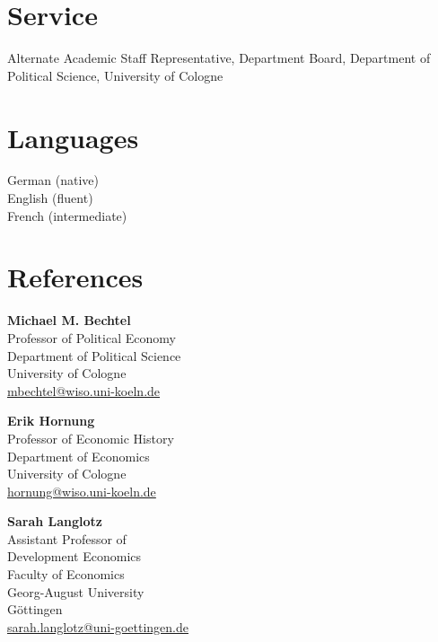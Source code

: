 \documentclass[a4paper,11pt]{article}
\begin{document}
\section{Service}

Alternate Academic Staff Representative, Department Board, Department of Political Science, University of Cologne

\section{Languages}

German (native)\\
English (fluent)\\
French (intermediate)

\section{References}

{\small
\begin{minipage}[t]{0.32\textwidth}
  \textbf{Michael M. Bechtel}\\
  Professor of Political Economy\\
  Department of Political Science\\
  University of Cologne\\
  \href{mailto:mbechtel@wiso.uni-koeln.de}{mbechtel@wiso.uni-koeln.de}
\end{minipage}\hfill
\begin{minipage}[t]{0.32\textwidth}
  \textbf{Erik Hornung}\\
  Professor of Economic History\\
  Department of Economics\\
  University of Cologne\\
  \href{mailto:hornung@wiso.uni-koeln.de}{hornung@wiso.uni-koeln.de}
\end{minipage}\hfill
\begin{minipage}[t]{0.32\textwidth}
  \textbf{Sarah Langlotz}\\
  Assistant Professor of\\
  Development Economics\\
  Faculty of Economics\\
  Georg-August University\\
  G\"ottingen\\
  \href{mailto:sarah.langlotz@uni-goettingen.de}{sarah.langlotz@uni-goettingen.de}
\end{minipage}
}
\end{document}
